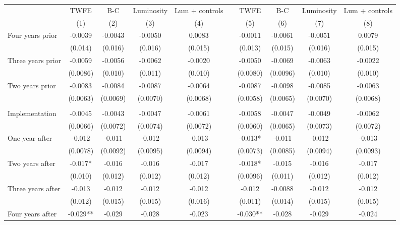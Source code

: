 \begin{tabular}{lccccccccc}
\toprule
      & TWFE  & B-C   & Luminosity & Lum + controls &       & TWFE  & B-C   & Luminosity & Lum + controls \\
\cmidrule{2-5}\cmidrule{7-10}      & (1)   & (2)   & (3)   & (4)   &       & (5)   & (6)   & (7)   & (8) \\
\midrule
\midrule
Four years prior & -0.0039 & -0.0043 & -0.0050 & 0.0083 &       & -0.0011 & -0.0061 & -0.0051 & 0.0079 \\
      & (0.014) & (0.016) & (0.016) & (0.015) &       & (0.013) & (0.015) & (0.016) & (0.015) \\
Three years prior & -0.0059 & -0.0056 & -0.0062 & -0.0020 &       & -0.0050 & -0.0069 & -0.0063 & -0.0022 \\
      & (0.0086) & (0.010) & (0.011) & (0.010) &       & (0.0080) & (0.0096) & (0.010) & (0.010) \\
Two years prior & -0.0083 & -0.0084 & -0.0087 & -0.0064 &       & -0.0087 & -0.0098 & -0.0085 & -0.0063 \\
      & (0.0063) & (0.0069) & (0.0070) & (0.0068) &       & (0.0058) & (0.0065) & (0.0070) & (0.0068) \\
      &       &       &       &       &       &       &       &       &  \\
Implementation & -0.0045 & -0.0043 & -0.0047 & -0.0061 &       & -0.0058 & -0.0047 & -0.0049 & -0.0062 \\
      & (0.0066) & (0.0072) & (0.0074) & (0.0072) &       & (0.0060) & (0.0065) & (0.0073) & (0.0072) \\
One year after & -0.012 & -0.011 & -0.012 & -0.013 &       & -0.013* & -0.011 & -0.012 & -0.013 \\
      & (0.0078) & (0.0092) & (0.0095) & (0.0094) &       & (0.0073) & (0.0085) & (0.0094) & (0.0093) \\
Two years after & -0.017* & -0.016 & -0.016 & -0.017 &       & -0.018* & -0.015 & -0.016 & -0.017 \\
      & (0.010) & (0.012) & (0.012) & (0.012) &       & (0.0096) & (0.011) & (0.012) & (0.012) \\
Three years after & -0.013 & -0.012 & -0.012 & -0.012 &       & -0.012 & -0.0088 & -0.012 & -0.012 \\
      & (0.012) & (0.015) & (0.015) & (0.016) &       & (0.011) & (0.014) & (0.015) & (0.015) \\
Four years after & -0.029** & -0.029 & -0.028 & -0.023 &       & -0.030** & -0.028 & -0.029 & -0.024 \\

\end{tabular}

